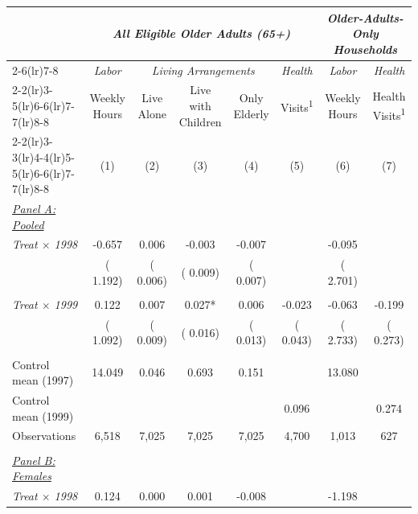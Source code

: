 \begin{tabular}{lccccccc} \hline \hline
& \multicolumn{5}{c}{\textit{All Eligible Older Adults (65+)}} & \multicolumn{2}{c}{\textit{Older-Adults-Only Households}} \\ \cmidrule(lr){2-6}\cmidrule(lr){7-8}
& \multicolumn{1}{c}{\textit{Labor}} & \multicolumn{3}{c}{\textit{Living Arrangements}} & \multicolumn{1}{c}{\textit{Health}} & \multicolumn{1}{c}{\textit{Labor}} & \multicolumn{1}{c}{\textit{Health}} \\ \cmidrule(lr){2-2}\cmidrule(lr){3-5}\cmidrule(lr){6-6}\cmidrule(lr){7-7}\cmidrule(lr){8-8}
& \multicolumn{1}{c}{Weekly Hours} & \multicolumn{1}{c}{Live Alone} & \multicolumn{1}{c}{Live with Children} & \multicolumn{1}{c}{Only Elderly} & \multicolumn{1}{c}{Visits\textsuperscript{1}} & \multicolumn{1}{c}{Weekly Hours} & \multicolumn{1}{c}{Health Visits\textsuperscript{1}} \\ 
\cmidrule(lr){2-2}\cmidrule(lr){3-3}\cmidrule(lr){4-4}\cmidrule(lr){5-5}\cmidrule(lr){6-6}\cmidrule(lr){7-7}\cmidrule(lr){8-8}
& \multicolumn{1}{c}{(1)} & \multicolumn{1}{c}{(2)} & \multicolumn{1}{c}{(3)} & \multicolumn{1}{c}{(4)} & \multicolumn{1}{c}{(5)} & \multicolumn{1}{c}{(6)} & \multicolumn{1}{c}{(7)} \\ \toprule
\underline{\textit{Panel A: Pooled}} \\ 
\textit{Treat $\times$ 1998} & -0.657 & 0.006 & -0.003 & -0.007 & & -0.095 & \\ 
 & (    1.192) & (    0.006) & (    0.009) & (    0.007) & & (    2.701) & \\ 
  & & & & & & & \\ 
\textit{Treat $\times$ 1999} & 0.122 & 0.007 & 0.027* & 0.006 & -0.023 & -0.063 & -0.199 \\ 
 & (    1.092) & (    0.009) & (    0.016) & (    0.013) & (    0.043) & (    2.733) & (    0.273) \\ 
  & & & & & & & \\ 
Control mean (1997) &    14.049 &     0.046 &     0.693 &     0.151 & &    13.080 & \\ 
Control mean (1999) & & & & &     0.096 & &     0.274 \\ 
Observations &        6,518 &        7,025 &        7,025 &        7,025 &        4,700 &        1,013 &          627 \\ 
  & & & & & & & \\ 
\underline{\textit{Panel B: Females}} \\ 
\textit{Treat $\times$ 1998} & 0.124 & 0.000 & 0.001 & -0.008 & & -1.198 & \\ 

\end{tabular}
